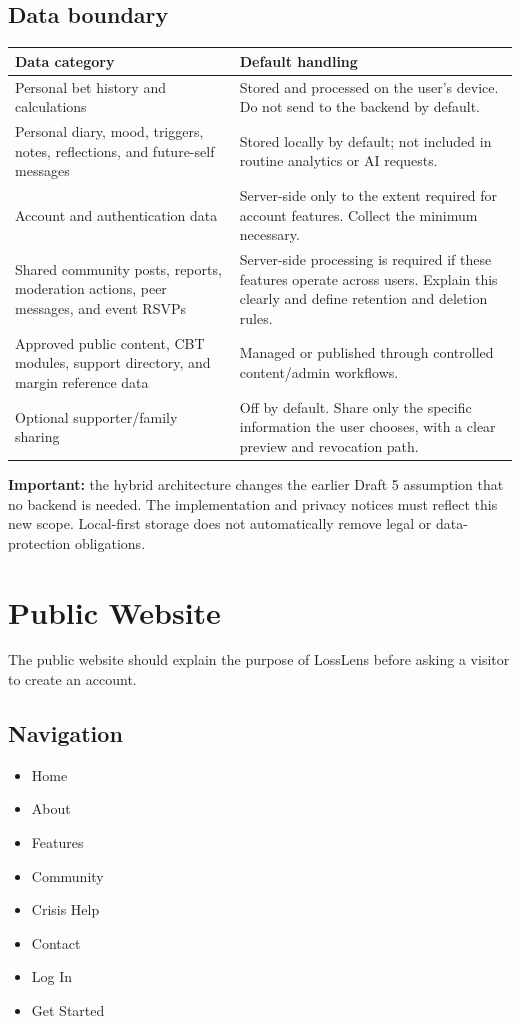 \documentclass[11pt,a4paper]{article}
\begin{document}
\subsection{Data boundary}
\begin{longtable}{p{}p{}}
\toprule
\textbf{Data category} & \textbf{Default handling} \\
\midrule
Personal bet history and calculations & Stored and processed on the user's device. Do not send to the backend by default. \\
Personal diary, mood, triggers, notes, reflections, and future-self messages & Stored locally by default; not included in routine analytics or AI requests. \\
Account and authentication data & Server-side only to the extent required for account features. Collect the minimum necessary. \\
Shared community posts, reports, moderation actions, peer messages, and event RSVPs & Server-side processing is required if these features operate across users. Explain this clearly and define retention and deletion rules. \\
Approved public content, CBT modules, support directory, and margin reference data & Managed or published through controlled content/admin workflows. \\
Optional supporter/family sharing & Off by default. Share only the specific information the user chooses, with a clear preview and revocation path. \\
\bottomrule
\end{longtable}

\textbf{Important:} the hybrid architecture changes the earlier Draft 5 assumption that no backend is needed. The implementation and privacy notices must reflect this new scope. Local-first storage does not automatically remove legal or data-protection obligations.

\section{Public Website}

The public website should explain the purpose of LossLens before asking a visitor to create an account.

\subsection{Navigation}
\begin{itemize}
  \item Home
  \item About
  \item Features
  \item Community
  \item Crisis Help
  \item Contact
  \item Log In
  \item Get Started
\end{itemize}
\end{document}

